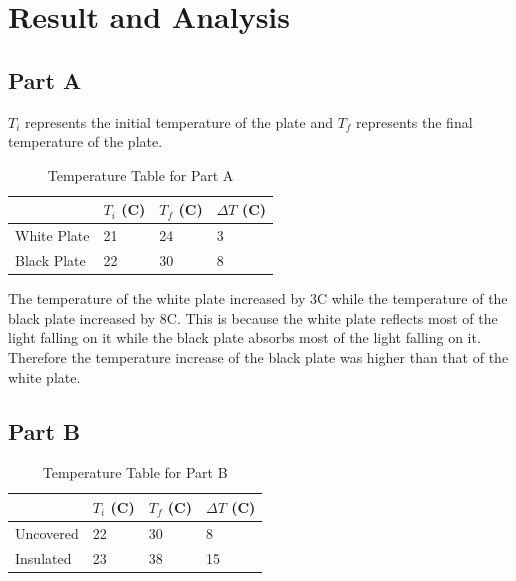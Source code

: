 \documentclass[a4paper, 12pt, english]{article}
\begin{document}
\section{Result and Analysis}
\subsection{Part A}
$T_i$ represents the initial temperature of the plate and $T_f$ represents the
final temperature of the plate.
\begin{table}[H]
	\centering
	\caption{Temperature Table for Part A}
	\label{tab:table1}
	\begin{tabular}{@{}llll@{}}
		\toprule
		            & \textbf{$T_i$ (\degree C)} & \textbf{$T_f$ (\degree C)} & \textbf{$\Delta T$ (\degree C)} \\ \midrule
		White Plate & 21                         & 24                         & 3                               \\
		Black Plate & 22                         & 30                         & 8                               \\ \bottomrule
	\end{tabular}
\end{table}

The temperature of the white plate increased by 3\degree C while the
temperature of the black plate increased by 8\degree C. This is because the
white plate reflects most of the light falling on it while the black plate
absorbs most of the light falling on it. Therefore the temperature increase of
the black plate was higher than that of the white plate.
\subsection{Part B}
\begin{table}[H]
	\centering
	\caption{Temperature Table for Part B}
	\label{tab:table2}
	\begin{tabular}{@{}llll@{}}
		\toprule
		          & \textbf{$T_i$ (\degree C)} & \textbf{$T_f$ (\degree C)} & \textbf{$\Delta T$ (\degree C)} \\ \midrule
		Uncovered & 22                         & 30                         & 8                               \\
		Insulated & 23                         & 38                         & 15                              \\ \bottomrule
	\end{tabular}
\end{table}
\end{document}
